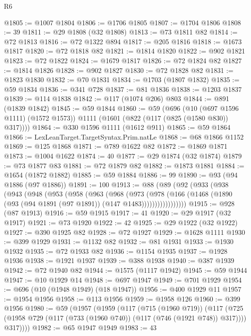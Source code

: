 \begin{lexlean}{R6}
\begin{coremodule}
@1805 := @1007 @1804
@1806 := @1706 @1805
@1807 := @1704 @1806
@1808 := 39
@1811 := @29 @1808 (@32 @1808)
@1813 := @73 @1811 @82
@1814 := @72 @1813
@1816 := @72 @1322 @894
@1817 := @205 @1816
@1818 := @1673 @1817
@1820 := @72 @1818 @82
@1821 := @1814 @1820
@1822 := @902 @1821
@1823 := @72 @1822
@1824 := @1679 @1817
@1826 := @72 @1824 @82
@1827 := @1814 @1826
@1828 := @902 @1827
@1830 := @72 @1828 @82
@1831 := @1823 @1830
@1832 := @70 @1831
@1834 := @1703 (@1807 @1832)
@1835 := @59 @1834
@1836 := @341 @728
@1837 := @81 @1836
@1838 := @1203 @1837
@1839 := @114 @1838
@1842 := @117 (@1074 @206) @803
@1844 := @891 (@1839 @1842)
@1845 := @59 @1844
@1860 := @59
    (@696
      (@10 (@697 @1596 @1111) (@1572 @1573))
      @1111
      (@1601 (@822 (@117 (@825 (@1580 @830)) @317))))
@1864 := @330 @1596 @1111 (@1612 @911)
@1865 := @59 @1864
@1866 := LexLeanTarget.TargetSyntax.Prim.natLe
@1868 := @68 @1866 @1152
@1869 := @125 @1868
@1871 := @789 @1622 @82
@1872 := @1869 @1871
@1873 := @1004 @1622
@1874 := 40
@1877 := @29 @1874 (@32 @1874)
@1879 := @73 @1877 @83
@1881 := @72 @1879 @82
@1882 := @1873 @1881
@1884 := @1654 (@1872 @1882)
@1885 := @59 @1884
@1886 := 99
@1890 := @93 (@94 @1886 (@97 @1886))
@1891 := 100
@1913 := @88
    (@89
      (@92
        (@933
          (@938
            (@943
              (@948
                (@953
                  (@958
                    (@963
                      (@968
                        (@973
                          (@978
                            (@166
                              (@1468
                                (@1890 (@93 (@94 @1891 (@97 @1891)) (@147 @1483)))))))))))))))))
@1915 := @928 (@87 @1913)
@1916 := @59 @1915
@1917 := 41
@1920 := @29 @1917 (@32 @1917)
@1921 := @73 @1920
@1922 := 42
@1925 := @29 @1922 (@32 @1922)
@1927 := @390 @1925 @82
@1928 := @72 @1927
@1929 := @1628 @1111
@1930 := @399 @1929
@1931 := @1132 @82
@1932 := @81 @1931
@1933 := @1930 @1932
@1935 := @72 @1933 @82
@1936 := @1154 @1935
@1937 := @1928 @1936
@1938 := @1921 @1937
@1939 := @388 @1938
@1940 := @387 @1939
@1942 := @72 @1940 @82
@1944 := @1575 (@1117 @1942)
@1945 := @59 @1944
@1947 := @10 @1929 @14
@1948 := @697 @1947
@1949 := @701 @1929
@1954 := @696 (@10 (@1948 @1949) (@18 @1947))
@1956 := @400 @1929 @11
@1957 := @1954 @1956
@1958 := @113 @1956
@1959 := @1958 @126
@1960 := @399 @1956
@1980 := @59
    (@1957
      (@1959
        (@117
          (@715 (@1960 @719))
          (@117
            (@725 (@1958 @729 (@117 (@733 (@1960 @740)) (@117 (@746 (@1921 @748)) @317))))
            @317))))
@1982 := @65 @1947 @1949
@1983 := 43

\end{coremodule}
\end{lexlean}
